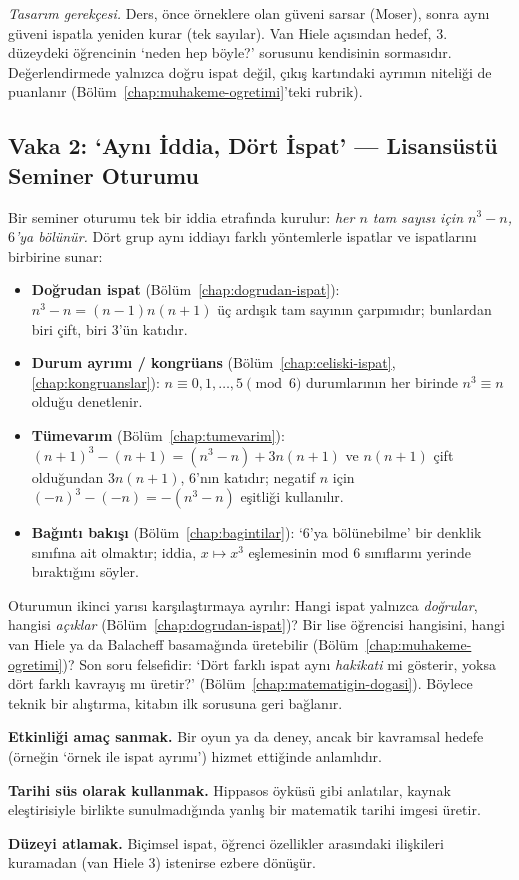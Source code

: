 \emph{Tasarım gerekçesi.} Ders, önce örneklere olan güveni sarsar (Moser), sonra aynı güveni ispatla yeniden kurar (tek sayılar). Van Hiele açısından hedef, 3. düzeydeki öğrencinin ‘neden hep böyle?’ sorusunu kendisinin sormasıdır. Değerlendirmede yalnızca doğru ispat değil, çıkış kartındaki ayrımın niteliği de puanlanır (Bölüm~\ref{chap:muhakeme-ogretimi}’teki rubrik).

\subsection{Vaka 2: ‘Aynı İddia, Dört İspat’ — Lisansüstü Seminer Oturumu}

Bir seminer oturumu tek bir iddia etrafında kurulur: \emph{her $n$ tam sayısı için $n^3-n$, $6$’ya bölünür.} Dört grup aynı iddiayı farklı yöntemlerle ispatlar ve ispatlarını birbirine sunar:
\begin{itemize}[leftmargin=1.4em]
\item \textbf{Doğrudan ispat} (Bölüm~\ref{chap:dogrudan-ispat}): $n^3-n=(n-1)n(n+1)$ üç ardışık tam sayının çarpımıdır; bunlardan biri çift, biri $3$’ün katıdır.
\item \textbf{Durum ayrımı / kongrüans} (Bölüm~\ref{chap:celiski-ispat}, \ref{chap:kongruanslar}): $n\equiv0,1,\dots,5\pmod 6$ durumlarının her birinde $n^3\equiv n$ olduğu denetlenir.
\item \textbf{Tümevarım} (Bölüm~\ref{chap:tumevarim}): $(n+1)^3-(n+1)=(n^3-n)+3n(n+1)$ ve $n(n+1)$ çift olduğundan $3n(n+1)$, $6$’nın katıdır; negatif $n$ için $(-n)^3-(-n)=-(n^3-n)$ eşitliği kullanılır.
\item \textbf{Bağıntı bakışı} (Bölüm~\ref{chap:bagintilar}): ‘$6$’ya bölünebilme’ bir denklik sınıfına ait olmaktır; iddia, $x\mapsto x^3$ eşlemesinin mod $6$ sınıflarını yerinde bıraktığını söyler.
\end{itemize}
Oturumun ikinci yarısı karşılaştırmaya ayrılır: Hangi ispat yalnızca \emph{doğrular}, hangisi \emph{açıklar} (Bölüm~\ref{chap:dogrudan-ispat})? Bir lise öğrencisi hangisini, hangi van Hiele ya da Balacheff basamağında üretebilir (Bölüm~\ref{chap:muhakeme-ogretimi})? Son soru felsefidir: ‘Dört farklı ispat aynı \emph{hakikati} mi gösterir, yoksa dört farklı kavrayış mı üretir?’ (Bölüm~\ref{chap:matematigin-dogasi}). Böylece teknik bir alıştırma, kitabın ilk sorusuna geri bağlanır.

\begin{yanilgi}
\textbf{Etkinliği amaç sanmak.} Bir oyun ya da deney, ancak bir kavramsal hedefe (örneğin ‘örnek ile ispat ayrımı’) hizmet ettiğinde anlamlıdır.

\smallskip
\textbf{Tarihi süs olarak kullanmak.} Hippasos öyküsü gibi anlatılar, kaynak eleştirisiyle birlikte sunulmadığında yanlış bir matematik tarihi imgesi üretir.

\smallskip
\textbf{Düzeyi atlamak.} Biçimsel ispat, öğrenci özellikler arasındaki ilişkileri kuramadan (van Hiele 3) istenirse ezbere dönüşür.
\end{yanilgi}

